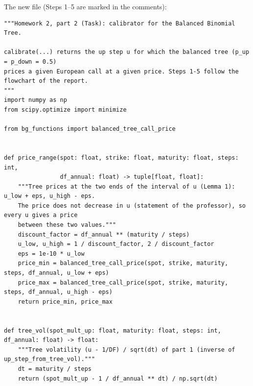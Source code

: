 \documentclass[11pt,a4paper]{article}
\newcommand{\subhead}[1]{\par\medskip\noindent{\large\bfseries #1}\par\smallskip\noindent\ignorespaces}
\begin{document}
\needspace{0.8\textheight}
\subhead{Q1 --- the code.} The new file (Steps 1--5 are marked in the comments):
\par\smallskip\noindent\begin{minipage}{\linewidth}\begin{lstlisting}[style=pysmall,title={new code (\texttt{calibrator.py})}]
"""Homework 2, part 2 (Task): calibrator for the Balanced Binomial Tree.

calibrate(...) returns the up step u for which the balanced tree (p_up = p_down = 0.5)
prices a given European call at a given price. Steps 1-5 follow the flowchart of the report.
"""
import numpy as np
from scipy.optimize import minimize

from bg_functions import balanced_tree_call_price


def price_range(spot: float, strike: float, maturity: float, steps: int,
                df_annual: float) -> tuple[float, float]:
    """Tree prices at the two ends of the interval of u (Lemma 1): u_low + eps, u_high - eps.
    The price does not decrease in u (statement of the professor), so every u gives a price
    between these two values."""
    discount_factor = df_annual ** (maturity / steps)
    u_low, u_high = 1 / discount_factor, 2 / discount_factor
    eps = 1e-10 * u_low
    price_min = balanced_tree_call_price(spot, strike, maturity, steps, df_annual, u_low + eps)
    price_max = balanced_tree_call_price(spot, strike, maturity, steps, df_annual, u_high - eps)
    return price_min, price_max


def tree_vol(spot_mult_up: float, maturity: float, steps: int, df_annual: float) -> float:
    """Tree volatility (u - 1/DF) / sqrt(dt) of part 1 (inverse of up_step_from_tree_vol)."""
    dt = maturity / steps
    return (spot_mult_up - 1 / df_annual ** dt) / np.sqrt(dt)



\end{lstlisting}
\end{minipage}
\end{document}

